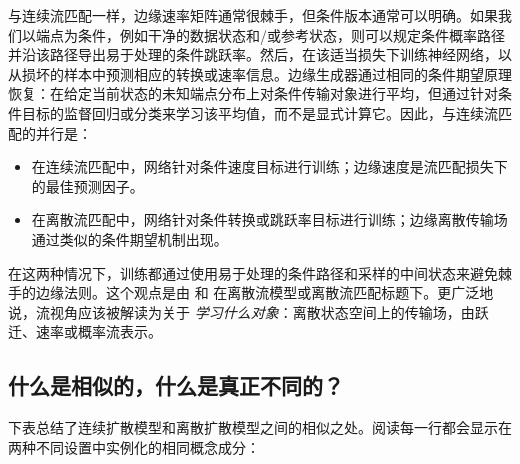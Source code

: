 与连续流匹配一样，边缘速率矩阵通常很棘手，但条件版本通常可以明确。如果我们以端点为条件，例如干净的数据状态和/或参考状态，则可以规定条件概率路径并沿该路径导出易于处理的条件跳跃率。然后，在该适当损失下训练神经网络，以从损坏的样本中预测相应的转换或速率信息。边缘生成器通过相同的条件期望原理恢复：在给定当前状态的未知端点分布上对条件传输对象进行平均，但通过针对条件目标的监督回归或分类来学习该平均值，而不是显式计算它。因此，与连续流匹配的并行是：
\begin{itemize}[leftmargin=2em]
    \item 在连续流匹配中，网络针对条件速度目标进行训练；边缘速度是流匹配损失下的最佳预测因子。
    \item 在离散流匹配中，网络针对条件转换或跳跃率目标进行训练；边缘离散传输场通过类似的条件期望机制出现。
\end{itemize}
在这两种情况下，训练都通过使用易于处理的条件路径和采样的中间状态来避免棘手的边缘法则。这个观点是由 \citet{campbell2024generative} 和
\citet{gat2024discrete} 在离散流模型或离散流匹配标题下。更广泛地说，流视角应该被解读为关于 \emph{学习什么对象}：离散状态空间上的传输场，由跃迁、速率或概率流表示。

\subsection{什么是相似的，什么是真正不同的？}
\label{subsec:epilogue-genuine-diff}

下表总结了连续扩散模型和离散扩散模型之间的相似之处。阅读每一行都会显示在两种不同设置中实例化的相同概念成分：


